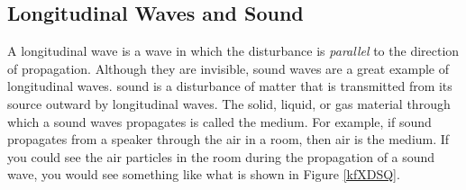 \documentclass{article}
\numberwithin{equation}{section}
\numberwithin{figure}{section}
\begin{document}
\clearpage
\subsection{Longitudinal Waves and Sound} \label{FpyvAr}

\begin{center}
    \captionsetup{type=figure,margin=1in}
    \label{fig:my_label}
\end{center}

A \gls{longitudinal wave} is a wave in which the disturbance is \textit{parallel} to the direction of propagation. Although they are invisible, sound waves are a great example of longitudinal waves. \Gls{sound} is a disturbance of matter that is transmitted from its source outward by longitudinal waves. The solid, liquid, or gas material through which a sound waves propagates is called the \gls{medium}. For example, if sound propagates from a speaker through the air in a room, then air is the medium. If you could see the air particles in the room during the propagation of a sound wave, you would see something like what is shown in Figure \ref{kfXDSQ}.
\end{document}
